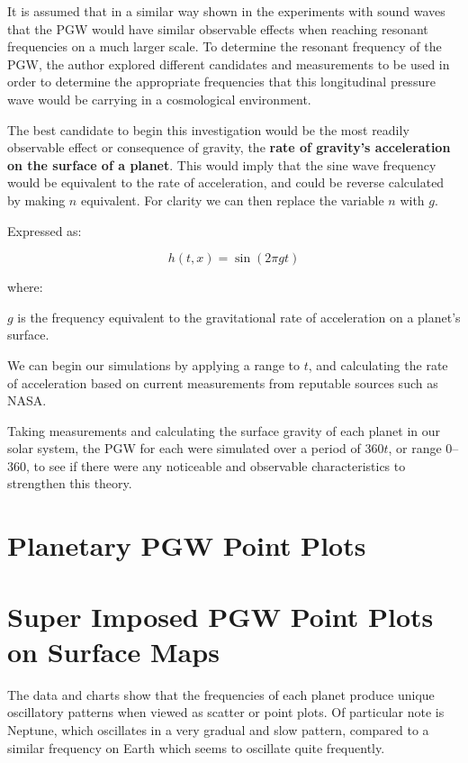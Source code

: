 \documentclass[12pt]{article}
\begin{document}
It is assumed that in a similar way shown in the experiments with sound waves that the PGW would have similar observable effects when reaching resonant frequencies on a much larger scale. To determine the resonant frequency of the PGW, the author explored different candidates and measurements to be used in order to determine the appropriate frequencies that this longitudinal pressure wave would be carrying in a cosmological environment.

The best candidate to begin this investigation would be the most readily observable effect or consequence of gravity, the \textbf{rate of gravity’s acceleration on the surface of a planet}. This would imply that the sine wave frequency would be equivalent to the rate of acceleration, and could be reverse calculated by making \(n\) equivalent. For clarity we can then replace the variable \(n\) with \(g\).

Expressed as:

\[
h(t,x) = \sin(2 \pi g t)
\]

where:

\(g\) is the frequency equivalent to the gravitational rate of acceleration on a planet’s surface.

We can begin our simulations by applying a range to \(t\), and calculating the rate of acceleration based on current measurements from reputable sources such as NASA.

Taking measurements and calculating the surface gravity of each planet in our solar system, the PGW for each were simulated over a period of 360\(t\), or range 0–360, to see if there were any noticeable and observable characteristics to strengthen this theory.

\section*{Planetary PGW Point Plots}


\section*{Super Imposed PGW Point Plots on Surface Maps}

The data and charts show that the frequencies of each planet produce unique oscillatory patterns when viewed as scatter or point plots. Of particular note is Neptune, which oscillates in a very gradual and slow pattern, compared to a similar frequency on Earth which seems to oscillate quite frequently.
\end{document}
